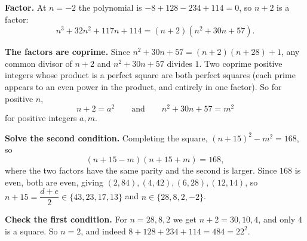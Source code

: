 \textbf{Factor.} At $n=-2$ the polynomial is $-8+128-234+114=0$, so $n+2$ is a factor:
\[n^3+32n^2+117n+114=(n+2)\left(n^2+30n+57\right).\]

\textbf{The factors are coprime.} Since $n^2+30n+57=(n+2)(n+28)+1$, any common divisor of $n+2$ and $n^2+30n+57$ divides $1$. Two coprime positive integers whose product is a perfect square are both perfect squares (each prime appears to an even power in the product, and entirely in one factor). So for positive $n$,
\[n+2=a^2\qquad\text{and}\qquad n^2+30n+57=m^2\]
for positive integers $a,m$.

\textbf{Solve the second condition.} Completing the square, $(n+15)^2-m^2=168$, so
\[(n+15-m)(n+15+m)=168,\]
where the two factors have the same parity and the second is larger. Since $168$ is even, both are even, giving $(2,84),(4,42),(6,28),(12,14)$, so $n+15=\dfrac{d+e}{2}\in\{43,23,17,13\}$ and $n\in\{28,8,2,-2\}$.

\textbf{Check the first condition.} For $n=28,8,2$ we get $n+2=30,10,4$, and only $4$ is a square. So $\boxed{n=2}$, and indeed $8+128+234+114=484=22^2$.

